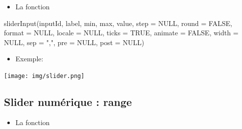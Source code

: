 \documentclass[
]{article}
\newenvironment{Shaded}{\begin{snugshade}}{\end{snugshade}}
\newcommand{\AttributeTok}[1]{\textcolor[rgb]{0.77,0.63,0.00}{#1}}
\newcommand{\CommentTok}[1]{\textcolor[rgb]{0.56,0.35,0.01}{\textit{#1}}}
\newcommand{\ConstantTok}[1]{\textcolor[rgb]{0.00,0.00,0.00}{#1}}
\newcommand{\DecValTok}[1]{\textcolor[rgb]{0.00,0.00,0.81}{#1}}
\newcommand{\FunctionTok}[1]{\textcolor[rgb]{0.00,0.00,0.00}{#1}}
\newcommand{\NormalTok}[1]{#1}
\newcommand{\StringTok}[1]{\textcolor[rgb]{0.31,0.60,0.02}{#1}}
\providecommand{\tightlist}{%
  \setlength{\itemsep}{0pt}\setlength{\parskip}{0pt}}
\begin{document}
\begin{itemize}
\tightlist
\item
  La fonction
\end{itemize}

\begin{Shaded}
\begin{Highlighting}[]
\FunctionTok{sliderInput}\NormalTok{(inputId, label, min, max, value, }\AttributeTok{step =} \ConstantTok{NULL}\NormalTok{, }\AttributeTok{round =} \ConstantTok{FALSE}\NormalTok{,}
            \AttributeTok{format =} \ConstantTok{NULL}\NormalTok{, }\AttributeTok{locale =} \ConstantTok{NULL}\NormalTok{, }\AttributeTok{ticks =} \ConstantTok{TRUE}\NormalTok{, }\AttributeTok{animate =} \ConstantTok{FALSE}\NormalTok{,}
            \AttributeTok{width =} \ConstantTok{NULL}\NormalTok{, }\AttributeTok{sep =} \StringTok{","}\NormalTok{, }\AttributeTok{pre =} \ConstantTok{NULL}\NormalTok{, }\AttributeTok{post =} \ConstantTok{NULL}\NormalTok{)}
\end{Highlighting}
\end{Shaded}

\begin{itemize}
\tightlist
\item
  Exemple:
\end{itemize}

\begin{Shaded}
\end{Shaded}

\texttt{[image: img/slider.png]}

\hypertarget{slider-numuxe9rique-range}{%
\subsection{Slider numérique : range}\label{slider-numuxe9rique-range}}

\begin{itemize}
\tightlist
\item
  La fonction
\end{itemize}
\end{document}
